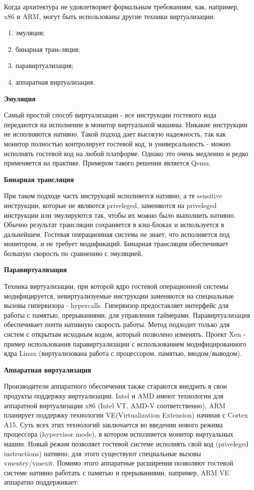 
Когда архитектура не удовлетворяет формальным требованиям, как, например, x86 и ARM, могут быть использованы другие техники виртуализации:

\begin{enumerate}
    \item эмуляция;
    \item бинарная транcляция;
    \item паравиртуализация;
    \item аппаратная виртуализация.
\end{enumerate}

\textbf{Эмуляция}

Самый простой способ виртуализации - все инструкции гостевого кода передаются  на исполнение в монитор виртуальной машины. Никакие инструкции не исполняются нативно. Такой подход дает высокую надежность, так как монитор полностью контролирует гостевой код, и универсальность - можно исполнять гостевой код на любой платформе. Однако это очень медленно и редко применяется на практике. Примером такого решения является Qemu.

\textbf{Бинарная трансляция}

При таком подходе часть инструкций исполняется нативно, а те sensitive инструкции, которые не являются priveleged, заменяются на priveleged инструкции или эмулируются так, чтобы их можно было выполнить нативно. Обычно результат трансляции сохраняется в кэш-блоках и используется в дальнейшем\cite{bib:vmware_understanding}. Гостевая операционная система не знает, что исполняется под монитором, и не требует модификаций. Бинарная трансляция обеспечивает большую скорость по сравнению с эмуляцией.

\textbf{Паравиртуализация}

Техника виртуализации, при которой ядро гостевой операционной системы модифицируется, невиртуализуемые инструкции заменяются на специальные вызовы гипервизора - hypercalls. Гипервизор предоставляет интерфейс для работы с памятью, прерываниями, для управления таймерами. Паравиртуализация обеспечивает почти нативную скорость работы. Метод подходит только для систем с открытым исходным кодом, который позволено изменять. Проект Xen\cite{bib:xen_art} - пример использования паравиртуализации  с использованием модифицированного ядра Linux (виртуализована работа с процессором, памятью, вводом/выводом).

\textbf{Аппаратная виртуализация}

Производители аппаратного обеспечения также стараются внедрить в свои продукты поддержку виртуализации. Intel и AMD имеют технологии для аппаратной виртуализации x86 (Intel VT, AMD-V соответственно), ARM планирует поддержку технологии VE(Virtualization Extension) начиная с Cortex A15. Суть всех этих технологий заключается во введении нового режима процессора (hypervisor mode), в котором исполняется монитор виртуальных машин. Новый режим позволяет гостевой системе исполнять свой код (priveleged instructions) нативно, для этого существуют специальные вызовы vmentry/vmexit\cite{bib:vmware_technique}. Помимо этого аппаратные расширения позволяют гостевой системе нативно работать с памятью и прерываниями, например, ARM VE аппаратно поддерживает:

